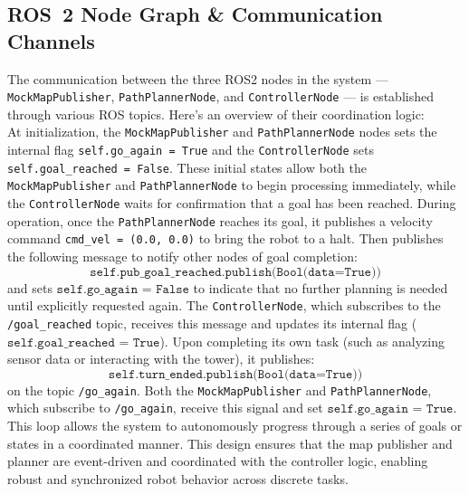 \subsection{ROS 2 Node Graph \& Communication Channels}
The communication between the three ROS2 nodes in the system — \texttt{MockMapPublisher}, \texttt{PathPlannerNode}, and \texttt{ControllerNode} — is established through various ROS topics. Here's an overview of their coordination logic:\\
At initialization, the \texttt{MockMapPublisher} and \texttt{PathPlannerNode} nodes sets the internal flag \texttt{self.go\_again = True} and the \texttt{ControllerNode} sets \texttt{self.goal\_reached = False}.
These initial states allow both the \texttt{MockMapPublisher} and \texttt{PathPlannerNode} to begin processing immediately, while the \texttt{ControllerNode} waits for confirmation that a goal has been reached.
During operation, once the \texttt{PathPlannerNode} reaches its goal, it publishes a velocity command \texttt{cmd\_vel = (0.0, 0.0)} to bring the robot to a halt. Then publishes the following message to notify other nodes of goal completion:
\[
    \texttt{self.pub\_goal\_reached.publish(Bool(data=True))}
\]
and sets $\texttt{self.go\_again = False}$ to indicate that no further planning is needed until explicitly requested again.
The \texttt{ControllerNode}, which subscribes to the \texttt{/goal\_reached} topic, receives this message and updates its internal flag ($\texttt{self.goal\_reached = True}$). Upon completing its own task (such as analyzing sensor data or interacting with the tower), it publishes:
\[
\texttt{self.turn\_ended.publish(Bool(data=True))}
\]
on the topic \texttt{/go\_again}.
Both the \texttt{MockMapPublisher} and \texttt{PathPlannerNode}, which subscribe to \texttt{/go\_again}, receive this signal and set $\texttt{self.go\_again = True}$.
This loop allows the system to autonomously progress through a series of goals or states in a coordinated manner.
This design ensures that the map publisher and planner are event-driven and coordinated with the controller logic, enabling robust and synchronized robot behavior across discrete tasks.

